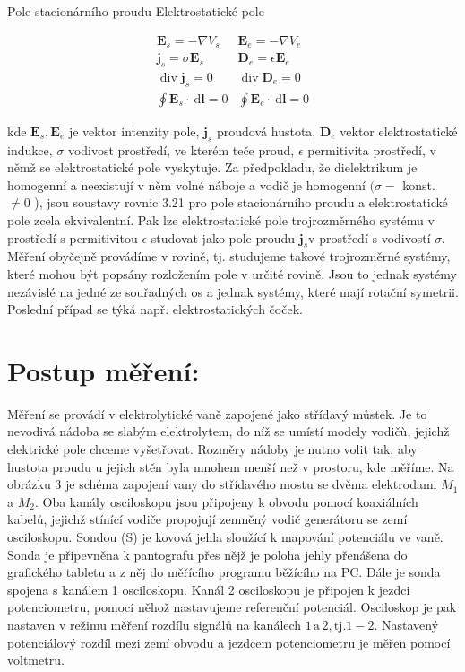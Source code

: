 \documentclass[czech,11pt,a4paper]{article}
\begin{document}
\begin{multicols}{2}
	Pole stacionárního proudu Elektrostatické pole
	
	\[
	\begin{array}{rc}
		\boldsymbol{E}_{s}=-\nabla V_{s} & \boldsymbol{E}_{e}=-\nabla V_{e}  \tag{3.21}\\
		\boldsymbol{j}_{s}=\sigma \boldsymbol{E}_{s} & \boldsymbol{D}_{e}=\epsilon \boldsymbol{E}_{e} \\
		\operatorname{div} \boldsymbol{j}_{s}=0 & \operatorname{div} \boldsymbol{D}_{e}=0 \\
		\oint \boldsymbol{E}_{s} \cdot \mathrm{~d} \boldsymbol{l}=0 & \oint \boldsymbol{E}_{e} \cdot \mathrm{~d} \boldsymbol{l}=0
	\end{array}
	\]
	
	kde $\boldsymbol{E}_{s}, \boldsymbol{E}_{e}$ je vektor intenzity pole, $\boldsymbol{j}_{s}$ proudová hustota, $\boldsymbol{D}_{e}$ vektor elektrostatické indukce, $\sigma$ vodivost prostředí, ve kterém teče proud, $\epsilon$ permitivita prostředí, v němž se elektrostatické pole vyskytuje. Za předpokladu, že dielektrikum je homogenní a neexistují v něm volné náboje a vodič je homogenní $(\sigma=$ konst. $\neq 0$ ), jsou soustavy rovnic 3.21 pro pole stacionárního proudu a elektrostatické pole zcela ekvivalentní. Pak lze elektrostatické pole trojrozměrného systému v prostředí s permitivitou $\epsilon$ studovat jako pole proudu $\boldsymbol{j}_{s} \mathrm{v}$ prostředí s vodivostí $\sigma$. Měření obyčejně provádíme v rovině, tj. studujeme takové trojrozměrné systémy, které mohou být popsány rozložením pole v určité rovině. Jsou to jednak systémy nezávislé na jedné ze souřadných os a jednak systémy, které mají rotační symetrii. Poslední případ se týká např. elektrostatických čoček.
	
	
	\section*{Postup měření:}
	Měření se provádí v elektrolytické vaně zapojené jako střídavý můstek. Je to nevodivá nádoba se slabým elektrolytem, do níž se umístí modely vodičù, jejichž elektrické pole chceme vyšetřovat. Rozměry nádoby je nutno volit tak, aby hustota proudu u jejich stěn byla mnohem menší než v prostoru, kde měříme. Na obrázku 3 je schéma zapojení vany do střídavého mostu se dvěma elektrodami $M_{1}$ a $M_{2}$. Oba kanály osciloskopu jsou připojeny k obvodu pomocí koaxiálních kabelů, jejichž stínící vodiče propojují zemněný vodič generátoru se zemí osciloskopu. Sondou (S) je kovová jehla sloužící k mapování potenciálu ve vaně. Sonda je připevněna k pantografu přes nějž je poloha jehly přenášena do grafického tabletu a z něj do měřícího programu běžícího na PC. Dále je sonda spojena s kanálem 1 osciloskopu. Kanál 2 osciloskopu je připojen k jezdci potenciometru, pomocí něhož nastavujeme referenční potenciál. Osciloskop je pak nastaven v režimu měření rozdílu signálů na kanálech $1 \,\mathrm{ a}\, 2, \mathrm{tj} .{ }{1}-2$. Nastavený potenciálový rozdíl mezi zemí obvodu a jezdcem potenciometru je měřen pomocí voltmetru.
	

\end{multicols}
\end{document}
